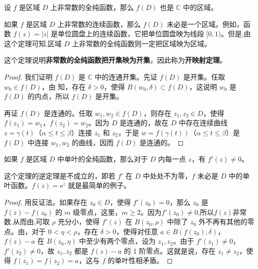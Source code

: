 \documentclass[../../main.tex]{subfiles}%
\begin{document}
\begin{theorem}[开映射定理]\label{theorem:定理4.4.6-开映射定理}
设 \( f \) 是区域 \( D \) 上非常数的全纯函数，那么 \( f(D) \) 也是 \( \mathbb{C} \) 中的区域。
\end{theorem}
\begin{remark}
如果 \( f \) 是区域 \( D \) 上非常数的连续函数，那么 \( f(D) \) 未必是一个区域。例如，函数 \( f(z) = |z| \) 是单位圆盘上的连续函数，它把单位圆盘映为线段 \([0, 1)\)。但是,由这个定理可知,区域 \( D \) 上非常数的全纯函数则一定把区域映为区域。
\end{remark}
\begin{note}
这个定理说明\textbf{非常数的全纯函数把开集映为开集}，因此称为\textbf{开映射定理}。
\end{note}
\begin{proof}
我们证明 \( f(D) \) 是 \( \mathbb{C} \) 中的连通开集。先证 \( f(D) \) 是开集。任取 \( w_0 \in f(D) \)，由 知，存在 \( \delta > 0 \)，使得 \( B(w_0, \delta) \subset f(D) \)，这说明 \( w_0 \) 是 \( f(D) \) 的内点，所以 \( f(D) \) 是开集。

再证 \( f(D) \) 是连通的。任取 \( w_1, w_2 \in f(D) \)，则存在 \( z_1, z_2 \in D \)，使得 \( f(z_1) = w_1 \)，\( f(z_2) = w_2 \)。因为 \( D \) 是连通的，故在 \( D \) 中存在连续曲线 \( z = \gamma(t) \)（\( \alpha \leqslant  t \leqslant  \beta \)）连接 \( z_1 \) 和 \( z_2 \)，于是 \( w = f(\gamma(t)) \)（\( \alpha \leqslant  t \leqslant  \beta \)）是 \( f(D) \) 中连接 \( w_1, w_2 \) 的曲线，因而 \( f(D) \) 是连通的。 
\end{proof}

\begin{theorem}\label{theorem:定理4.4.7}
如果 \( f \) 是区域 \( D \) 中单叶的全纯函数，那么对于 \( D \) 内每一点 \( z \)，有 \( f'(z) \neq 0 \)。
\end{theorem}
\begin{remark}
这个定理的逆定理是不成立的，即若 \( f' \) 在 \( D \) 中处处不为零，\( f \) 未必是 \( D \) 中的单叶函数。\( f(z) = \mathrm{e}^z \) 就是最简单的例子。
\end{remark}
\begin{proof}
用反证法。如果存在 \( z_0 \in D \)，使得 \( f'(z_0) = 0 \)，那么 \( z_0 \) 是 \( f(z) - f(z_0) \) 的 \( m \) 级零点，这里，\( m \geqslant  2 \)。因为$f'(z_0)\ne 0$,所以$f(z)$非常数.从而由,可取 \( \rho \) 充分小，使得 \( f'(z) \) 在 \( B(z_0, \rho) \) 中除了 \( z_0 \) 外不再有其他的零点。由，对于 \( 0 < \eta < \rho \)，存在 \( \delta > 0 \)，使得对任意 \( a \in B(f(z_0), \delta) \)，\( f(z) - a \) 在 \( B(z_0, \eta) \) 中至少有两个零点，设为 \( z_1, z_2 \)。由于 \( f'(z_1) \neq 0 \)，\( f'(z_2) \neq 0 \)，故 \( z_1, z_2 \) 都是 \( f(z) - a \) 的 1 阶零点。这就是说，存在 \( z_1 \neq z_2 \)，使得 \( f(z_1) = f(z_2) = a \)，这与 \( f \) 的单叶性相矛盾。 
\end{proof}
\end{document}

